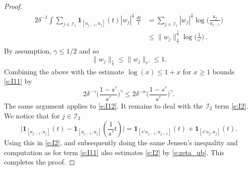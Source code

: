 \documentclass[12pt,reqno,a4paper,dvipsnames]{amsart}
\theoremstyle{plain}
\theoremstyle{definition}
\numberwithin{theorem}{section}
\numberwithin{equation}{section}
\begin{document}
\begin{proof}
\begin{align*}
        2\delta^{-1} \int \sum_{j \in \mathcal{I}_1} \mathbf{1}_{[u_{j-1}, u_j]}(t) |w_j|^{\frac{1}{\gamma}} \, \frac{\mathrm{d}t}{t} &= \sum_{j \in \mathcal{I}_1} |w_j|^{\frac{1}{\gamma}} \log\Big( \frac{u_j}{u_{j-1}} \Big)\\
        &\le \|w_j\|_{\frac{1}{\gamma}}^{\frac{1}{\gamma}} \log\Big(\frac{1}{s'} \Big)\,.
    \end{align*}
    By assumption, $\gamma \le 1/2$ and so 
    \[
        \|w_j\|_{\frac{1}{\gamma}} \le \|w_j\|_{r'} \le 1.
    \]
    Combining the above with the estimate $\log(x) \le 1 + x$ for $x \ge 1$ bounds \eqref{e:I11} by 
    \begin{equation}
        \label{e:zeta_ub}
        2 \delta^{-\gamma} \Big(\frac{1 - s'}{s'}\Big)^\gamma \le 2 \delta^{-\alpha} \Big(\frac{1 - s'}{s'}\Big)^\gamma.
    \end{equation}
    The same argument applies to \eqref{e:I12}.
    It remains to deal with the $\mathcal{I}_2$ term \eqref{e:I2}. We  notice that for $j \in \mathcal{I}_2$ 
    \begin{equation}
        \label{e:tel}
        \big|\mathbf{1}_{[u_{j-1}, u_j]}(t) - \mathbf{1}_{[u_{j-1}, u_j]}(\frac{1}{s'}t)\big| = \mathbf{1}_{[s'u_{j-1}, u_{j-1}]}(t) + \mathbf{1}_{[s'u_j, u_j]}(t).
    \end{equation}
    Using this in \eqref{e:I2}, and subsequently doing the same Jensen's inequality and computation as for term \eqref{e:I11} also estimates \eqref{e:I2} by \eqref{e:zeta_ub}. This completes the proof. 
    \end{proof}
\end{document}

